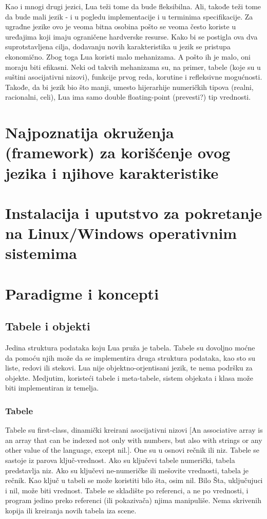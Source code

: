 \documentclass[a4paper]{article}
\begin{document}
Kao i mnogi drugi jezici, Lua teži tome da bude fleksibilna. Ali, takođe teži tome da bude mali jezik - i u pogledu implementacije i u terminima specifikacije. Za ugrađne jezike ovo je veoma bitna osobina pošto se veoma često koriste u uređajima koji imaju ograničene hardverske resurse. Kako bi se postigla ova dva suprotstavljena cilja, dodavanju novih karakteristika u jezik se pristupa ekonomično. Zbog toga Lua koristi malo mehanizama. A pošto ih je malo, oni moraju biti efikasni. Neki od takvih mehanizama su, na primer, tabele (koje su u suštini asocijativni nizovi), funkcije prvog reda, korutine i refleksivne mogućnosti. Takođe, da bi jezik bio što manji, umesto hijerarhije numeričkih tipova (realni, racionalni, celi), Lua ima samo double floating-point (prevesti?) tip vrednosti.\cite{multiParadigms}

\section{Najpoznatija okruženja (framework) za korišćenje ovog jezika i njihove karakteristike}
\label{sec:framework}


\section{Instalacija i uputstvo za pokretanje na Linux/Windows operativnim sistemima}
\label{sec:instalacija}


\section{Paradigme i koncepti}
\label{sec:paradigme_koncepti}

\subsection{Tabele i objekti}
Jedina struktura podataka koju Lua pruža je tabela. Tabele su dovoljno moćne da pomoću njih može da se implementira druga struktura podataka, kao sto su liste, redovi ili stekovi.
Lua nije objektno-orjentisani jezik, te nema podršku za objekte. Medjutim, koristeći tabele i meta-tabele, sistem objekata i klasa može biti implementiran iz temelja.

\subsubsection{Tabele}
Tabele su first-class, dinamički kreirani asocijativni nizovi [An associative array is an array that can be indexed not only with numbers, but also with strings or any other value of the language, except nil.]. One su u osnovi rečnik ili niz. Tabele se sastoje iz parova ključ-vrednost. Ako su ključevi tabele numerički, tabela predstavlja niz. Ako su ključevi ne-numeričke ili mešovite vrednosti, tabela je rečnik. Kao ključ u tabeli se može koristiti bilo šta, osim nil. Bilo Šta, uključujuci i nil, može biti vrednost.
Tabele se skladište po referenci, a ne po vrednosti, i program jedino preko referenci (ili pokazivača) njima manipuliše. Nema skrivenih kopija ili kreiranja novih tabela iza scene.
\end{document}
